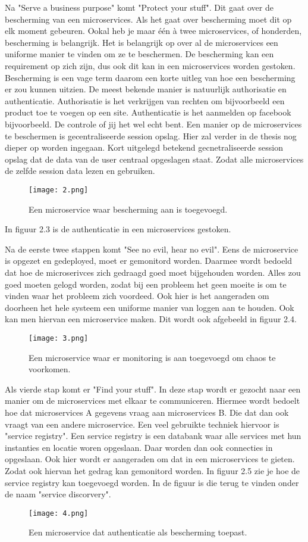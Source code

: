 Na "Serve a business purpose" komt "Protect your stuff". Dit gaat over de bescherming van een microservices. Als het gaat over bescherming moet dit op elk moment gebeuren. Ookal heb je maar één à twee microservices, of honderden, bescherming is belangrijk. Het is belangrijk op over al de microservices een uniforme manier te vinden om ze te beschermen. De bescherming kan een requirement op zich zijn, dus ook dit kan in een microservices worden gestoken. Bescherming is een vage term daarom een korte uitleg van hoe een bescherming er zou kunnen uitzien. De meest bekende manier is natuurlijk authorisatie en authenticatie. Authorisatie is het verkrijgen van rechten om bijvoorbeeld een product toe te voegen op een site. Authenticatie is het aanmelden op facebook bijvoorbeeld. De controle of jij het wel echt bent. Een manier op de microservices te beschermen is gecentraliseerde session opslag. Hier zal verder in de thesis nog dieper op worden ingegaan. Kort uitgelegd betekend gecnetraliseerde session opslag dat de data van de user centraal opgeslagen staat. Zodat alle microservices de zelfde session data lezen en gebruiken. 
\begin{figure}[h]
	\texttt{[image: 2.png]}
	\caption{Een microservice waar bescherming aan is toegevoegd. \textcite{Benetis2016}}
	\centering
\end{figure}
In figuur 2.3 is de authenticatie in een microservices gestoken. 

Na de eerste twee stappen komt "See no evil, hear no evil". Eens de microservice is opgezet en gedeployed, moet er gemonitord worden. Daarmee wordt bedoeld dat hoe de microserivces zich gedraagd goed moet bijgehouden worden. Alles zou goed moeten gelogd worden, zodat bij een probleem het geen moeite is om te vinden waar het probleem zich voordeed. Ook hier is het aangeraden om doorheen het hele systeem een uniforme manier van loggen aan te houden. Ook kan men hiervan een microservice maken. Dit wordt ook afgebeeld in figuur 2.4.
\begin{figure}[h]
	\texttt{[image: 3.png]}
	\caption{Een microservice waar er monitoring is aan toegevoegd om chaos te voorkomen. \textcite{Benetis2016}}
	\centering
\end{figure}

Als vierde stap komt er "Find your stuff". In deze stap wordt er gezocht naar een manier om de microservices met elkaar te communiceren. Hiermee wordt bedoelt hoe dat microservices A gegevens vraag aan microservices B. Die dat dan ook vraagt van een andere microservice. Een veel gebruikte techniek hiervoor is "service registry". Een service registry is een databank waar alle services met hun instanties en locatie woren opgeslaan. Daar worden dan ook connecties in opgeslaan. Ook hier wordt er aangeraden om dat in een microservices te gieten. Zodat ook hiervan het gedrag kan gemonitord worden. In figuur 2.5 zie je hoe de service registry kan toegevoegd worden. In de figuur is die terug te vinden onder de naam "service discorvery".
\begin{figure}[h]
	\texttt{[image: 4.png]}
	\caption{Een microservice dat authenticatie als bescherming toepast. \textcite{Benetis2016}}
	\centering
\end{figure}

